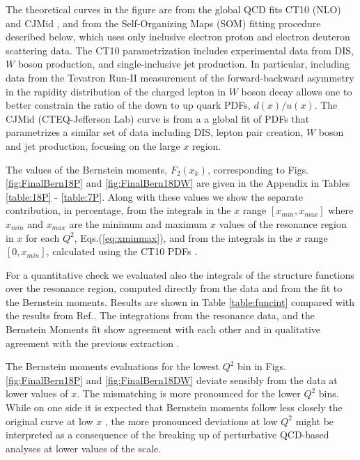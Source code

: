 \documentclass[
twocolumn,
aps,prd,
nofootinbib,
superscriptaddress,
showpacs,ligh
tightenlines, 
]{revtex4}
\begin{document}
The theoretical curves in the figure are from the global QCD fits CT10 (NLO) \cite{Lai:2010vv} and CJMid \cite{Accardi:2011}, and from the Self-Organizing Maps (SOM) fitting procedure described below, which uses only inclusive electron proton and electron deuteron scattering data. 
%
The CT10 parametrization includes experimental
data from DIS, $W$ boson production, and single-inclusive jet production. In particular, including data from the Tevatron Run-II measurement of the forward-backward asymmetry in the rapidity distribution of the charged lepton in $W$ boson decay allows one to better constrain the ratio of the down to up quark PDFs, $d(x)/u(x)$.
%
The CJMid (CTEQ-Jefferson Lab) curve is from a a global fit of PDFs that  parametrizes a similar set of data including DIS, lepton pair creation, $W$ boson and jet production, focusing on the large $x$ region. 

The values of the Bernstein moments, $F_{2}(x_{k})$, corresponding to Figs.\ref{fig:FinalBern18P} and  \ref{fig:FinalBern18DW} are given in the Appendix in Tables \ref{table:18P} - \ref{table:7P}. Along with these values we show the separate contribution, in percentage, from the integrals in the $x$ range $[x_{min},x_{max}]$ where $x_{min}$ and $x_{max}$ are the minimum and maximum $x$ values of the resonance region in $x$ for each $Q^{2}$, Eqs.(\ref{eq:xminmax}), and from the integrals in the $x$ range $[0,x_{min}]$, calculated using the CT10 PDFs \cite{Lai:2010vv}.

For a quantitative check we evaluated also the integrals of the structure functions over the resonance region, computed directly from the data and from the fit to the Bernstein moments. Results are shown in Table \ref{table:funcint} compared with the results from Ref.\cite{Bianchi:2003hi}.  The integrations from the resonance data, and the Bernstein Moments fit show agreement with each other and in qualitative agreement with the previous extraction \cite{Bianchi:2003hi}.  

The Bernstein moments evaluations for the lowest $Q^2$ bin in Figs.\ref{fig:FinalBern18P} and  \ref{fig:FinalBern18DW} deviate sensibly from the data at lower values of $x$. The mismatching is more pronounced for the lower $Q^2$ bins. While on one side it is expected that Bernstein moments follow less closely the original curve at low $x$ \cite{Yndurain:1977wz}, the more pronounced deviations at low $Q^2$ might be interpreted as a consequence of the breaking up of perturbative QCD-based analyses at lower values of the scale.  
\end{document}
